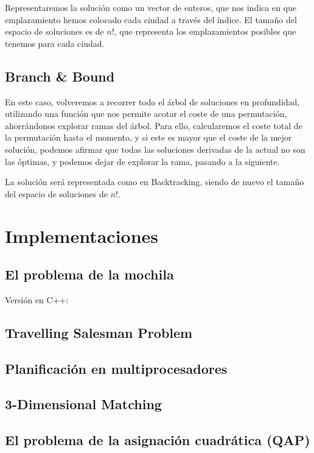 \documentclass[a4paper, 11pt]{article} %
\begin{document}
  Representaremos la solución como un vector de enteros, que nos indica en que emplazamiento hemos colocado cada ciudad a través del índice. El tamaño del espacio de soluciones es de $n!$, que representa los emplazamientos posibles que tenemos para cada ciudad. 
  
  \subsection{Branch \& Bound}
  
  En este caso, volveremos a recorrer todo el árbol de soluciones en profundidad, utilizando una función que nos permite acotar el coste de una permutación, ahorrándonos explorar ramas del árbol. Para ello, calcularemos el coste total de la permutación hasta el momento, y si este es mayor que el coste de la mejor solución, podemos afirmar que todas las soluciones derivadas de la actual no son las óptimas, y podemos dejar de explorar la rama, pasando a la siguiente. 
  
  La solución será representada como en Backtracking, siendo de nuevo el tamaño del espacio de soluciones de $n!$.


\section{Implementaciones}
  \subsection{El problema de la mochila}
        Versión en C++:
        
        \small
  	\texttt{}
        \normalsize
        
        
  \subsection{Travelling Salesman Problem}
        \small
  	\texttt{}
        \normalsize
  \subsection{Planificación en multiprocesadores}
        \small
  	\texttt{}
        \normalsize
  \subsection{3-Dimensional Matching}
        \small
  	\texttt{}
        \normalsize
  \subsection{El problema de la asignación cuadrática (QAP)}
        \small
        \normalsize

    
\end{document}
